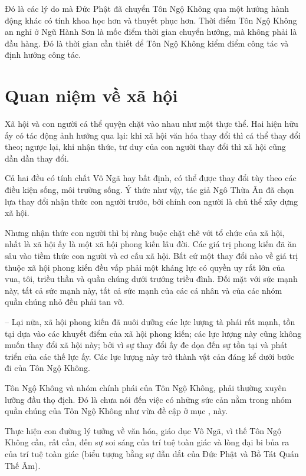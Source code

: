 Đó là các lý do mà Đức Phật đã chuyển Tôn Ngộ Không qua một hướng hành động khác có tính khoa học hơn và thuyết phục hơn. Thời điểm Tôn Ngộ Không an nghỉ ở Ngũ Hành Sơn là mốc điểm thời gian chuyển hướng, mà không phải là đầu hàng. Đó là thời gian cần thiết để Tôn Ngộ Không kiểm điểm công tác và định hướng công tác.


\section{Quan niệm về xã hội} %
\label{sec:8_xa_hoi}

Xã hội và con người cá thể quyện chặt vào nhau như một thực thể. Hai hiện hữu ấy có tác động ảnh hưởng qua lại: khi xã hội văn hóa thay đổi thì cá thể thay đổi theo; ngược lại, khi nhận thức, tư duy của con người thay đổi thì xã hội cũng dần dần thay đổi.

Cả hai đều có tính chất Vô Ngã hay bất định, có thể được thay đổi tùy theo các điều kiện sống, môi trường sống. Ý thức như vậy, tác giả Ngô Thừa Ân đã chọn lựa thay đổi nhận thức con người trước, bởi chính con người là chủ thể xây dựng xã hội.

Nhưng nhận thức con người thì bị ràng buộc chặt chẽ với tổ chức của xã hội, nhất là xã hội ấy là một xã hội phong kiến lâu đời. Các giá trị phong kiến đã ăn sâu vào tiềm thức con người và cơ cấu xã hội. Bất cứ một thay đổi nào về giá trị thuộc xã hội phong kiến đều vấp phải một kháng lực có quyền uy rất lớn của vua, tôi, triều thần và quần chúng dưới trướng triều đình. Đối mặt với sức mạnh này, tất cả sức mạnh này, tất cả sức mạnh của các cá nhân và của các nhóm quần chúng nhỏ đều phải tan vỡ.

-- Lại nữa, xã hội phong kiến đã nuôi dưỡng các lực lượng tà phái rất mạnh, tồn tại dựa vào các khuyết điểm của xã hội phong kiến; các lực lượng này cũng không muốn thay đổi xã hội này; bởi vì sự thay đổi ấy đe dọa đến sự tồn tại và phát triển của các thế lực ấy. Các lực lượng này trở thành vật cản đáng kể dưới bước đi của Tôn Ngộ Không.

Tôn Ngộ Không và nhóm chính phái của Tôn Ngộ Không, phải thường xuyên lưỡng đầu thọ địch. Đó là chưa nói đến việc có những sức cản nằm trong nhóm quần chúng của Tôn Ngộ Không như vừa đề cập ở mục ,  này.

Thực hiện con đường lý tưởng về văn hóa, giáo dục Vô Ngã, vì thế Tôn Ngộ Không cần, rất cần, đến sự soi sáng của trí tuệ toàn giác và lòng đại bi bủa ra của trí tuệ toàn giác (biểu tượng bằng sự dẫn dắt của Đức Phật và Bồ Tát Quán Thế Âm).

